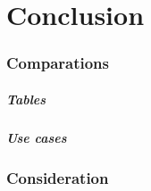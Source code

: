 \chapter{Conclusion}

\subsection{Comparations}
    \paragraph{Tables}
    \paragraph{Use cases}

\subsection{Consideration}
